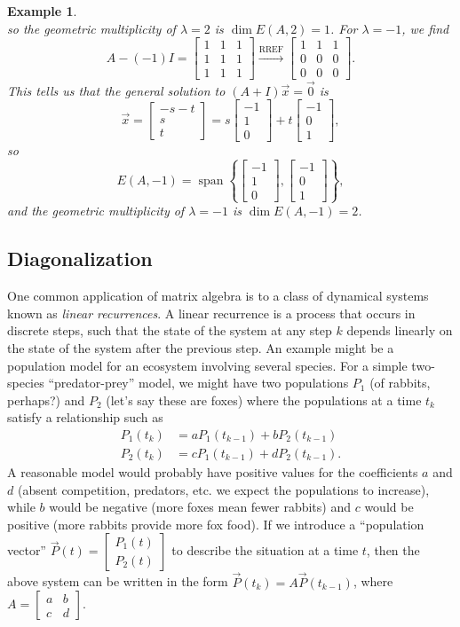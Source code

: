 \documentclass[12pt,letterpaper]{article}
\newtheorem{eg}[theorem]{Example}
\newenvironment{example}{\begin{eg}\rm}{\end{eg}}
\newcommand{\bbm}{\begin{bmatrix}}
\newcommand{\ebm}{\end{bmatrix}}
\begin{document}
\begin{example}
\[\]
so the geometric multiplicity of $\lambda = 2$ is $\dim E(A,2) = 1$. For $\lambda = -1$, we find
\[
 A-(-1)I = \bbm 1&1&1\\1&1&1\\1&1&1\ebm \xrightarrow{\text{RREF}} \bbm 1&1&1\\0&0&0\\0&0&0\ebm.
\]
This tells us that the general solution to $(A+I)\vec{x}=\vec{0}$ is
\[
 \vec{x} = \bbm -s-t\\s\\t\ebm = s\bbm -1\\1\\0\ebm + t\bbm -1\\0\\1\ebm,
\]
so
\[
 E(A,-1) = \operatorname{span}\left\{\bbm -1\\1\\0\ebm, \bbm -1\\0\\1\ebm\right\},
\]
and the geometric multiplicity of $\lambda = -1$ is $\dim E(A,-1) = 2$.
\end{example}

\subsection{Diagonalization}

One common application of matrix algebra is to a class of dynamical systems known as \textit{linear recurrences}. A linear recurrence is a process that occurs in discrete steps, such that the state of the system at any step $k$ depends linearly on the state of the system after the previous step. An example might be a population model for an ecosystem involving several species. For a simple two-species ``predator-prey'' model, we might have two populations $P_1$ (of rabbits, perhaps?) and $P_2$ (let's say these are foxes) where the populations at a time $t_k$ satisfy a relationship such as
\begin{align*}
 P_1(t_k) &= aP_1(t_{k-1}) + bP_2(t_{k-1})\\
 P_2(t_k) &= cP_1(t_{k-1}) + dP_2(t_{k-1}).
\end{align*}
A reasonable model would probably have positive values for the coefficients $a$ and $d$ (absent competition, predators, etc. we expect the populations to increase), while $b$ would be negative (more foxes mean fewer rabbits) and $c$ would be positive (more rabbits provide more fox food). If we introduce a ``population vector'' $\vec{P}(t) = \bbm P_1(t)\\P_2(t)\ebm$ to describe the situation at a time $t$, then the above system can be written in the form $\vec{P}(t_k) = A\vec{P}(t_{k-1})$, where $A = \bbm a&b\\c&d\ebm$.
\end{document}
